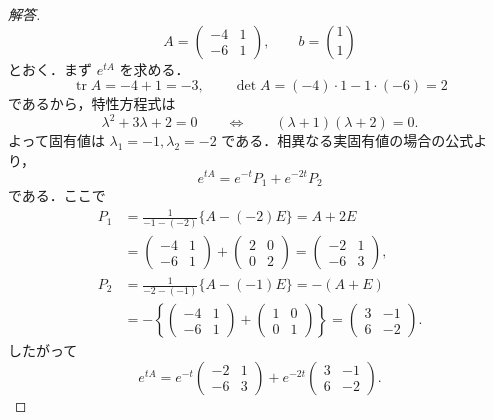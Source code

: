 \documentclass[article,paper=a4paper]{jlreq}
\begin{document}
\begin{proof}[解答]
\[
  A=
  \begin{pmatrix}
    -4 & 1\\
    -6 & 1
  \end{pmatrix},
  \qquad
  b=\binom{1}{1}
\]
とおく．まず $e^{tA}$ を求める．
\[
  \operatorname{tr}A=-4+1=-3,
  \qquad
  \det A=(-4)\cdot1-1\cdot(-6)=2
\]
であるから，特性方程式は
\[
  \lambda^2+3\lambda+2=0
  \qquad\Longleftrightarrow\qquad
  (\lambda+1)(\lambda+2)=0.
\]
よって固有値は $\lambda_1=-1,\lambda_2=-2$ である．相異なる実固有値の場合の公式より，
\[
  e^{tA}=e^{-t}P_1+e^{-2t}P_2
\]
である．ここで
\begin{align*}
  P_1
    &=
    \frac{1}{-1-(-2)}\{A-(-2)E\}
     =
    A+2E\\
    &=
    \begin{pmatrix}
      -4 & 1\\
      -6 & 1
    \end{pmatrix}
    +
    \begin{pmatrix}
      2 & 0\\
      0 & 2
    \end{pmatrix}
     =
    \begin{pmatrix}
      -2 & 1\\
      -6 & 3
    \end{pmatrix},\\
  P_2
    &=
    \frac{1}{-2-(-1)}\{A-(-1)E\}
     =
    -(A+E)\\
    &=
    -
    \left\{
    \begin{pmatrix}
      -4 & 1\\
      -6 & 1
    \end{pmatrix}
    +
    \begin{pmatrix}
      1 & 0\\
      0 & 1
    \end{pmatrix}
    \right\}
     =
    \begin{pmatrix}
      3 & -1\\
      6 & -2
    \end{pmatrix}.
\end{align*}
したがって
\[
  e^{tA}
    =
    e^{-t}
    \begin{pmatrix}
      -2 & 1\\
      -6 & 3
    \end{pmatrix}
    +
    e^{-2t}
    \begin{pmatrix}
      3 & -1\\
      6 & -2
    \end{pmatrix}.
\]


\end{proof}
\end{document}
